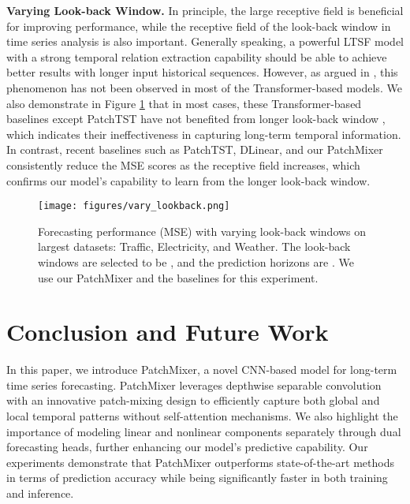 \documentclass{article} \usepackage{iclr2024_conference,times}
\begin{document}
\noindent \textbf{Varying Look-back Window.} In principle, the large receptive field is beneficial for improving performance, while the receptive field of the look-back window in time series analysis is also important. Generally speaking, a powerful LTSF model with a strong temporal relation extraction capability should be able to achieve better results with longer input historical sequences. However, as argued in \citet{dlinear}, this phenomenon has not been observed in most of the Transformer-based models. We also demonstrate in Figure \ref{fig::varying_lookback} that in most cases, these Transformer-based baselines except PatchTST have not benefited from longer look-back window , which indicates their ineffectiveness in capturing long-term temporal information. In contrast, recent baselines such as PatchTST, DLinear, and our PatchMixer consistently reduce the MSE scores as the receptive field increases, which confirms our model's capability to learn from the longer look-back window.

\begin{figure}[h]
\begin{center}
\texttt{[image: figures/vary\_lookback.png]}
\end{center}
\caption[Forecasting performance (MSE) with varying look-back windows on  largest datasets]{Forecasting performance (MSE) with varying look-back windows on  largest datasets: Traffic, Electricity, and Weather. The look-back windows are selected to be , and the prediction horizons are . We use our PatchMixer and the baselines for this experiment.\footnotemark}
\label{fig::varying_lookback}
\end{figure}


\section{Conclusion and Future Work}

In this paper, we introduce PatchMixer, a novel CNN-based model for long-term time series forecasting. PatchMixer leverages depthwise separable convolution with an innovative patch-mixing design to efficiently capture both global and local temporal patterns without self-attention mechanisms. We also highlight the importance of modeling linear and nonlinear components separately through dual forecasting heads, further enhancing our model's predictive capability. Our experiments demonstrate that PatchMixer outperforms state-of-the-art methods in terms of prediction accuracy while being significantly faster in both training and inference. 
\end{document}
